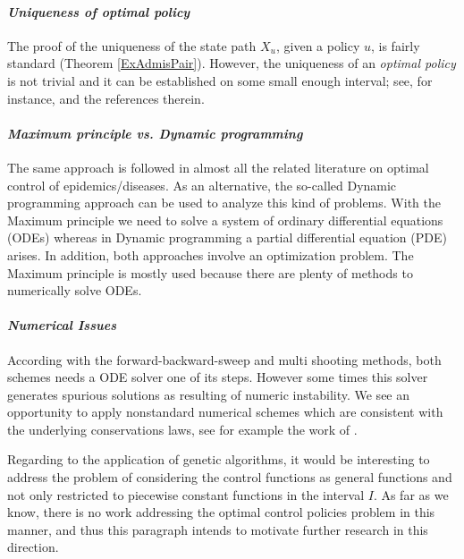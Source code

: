\paragraph{\it Uniqueness of optimal policy}
The proof of the uniqueness of the state path $X_u$, given a policy $u$, is
fairly standard (Theorem \ref{ExAdmisPair}). However, the uniqueness of an 
{\it optimal policy} is not trivial and it can be established on some small 
enough interval; see, for instance, \cite{GaffSchaefer09} and the references 
therein.  
\medskip

\paragraph{\it Maximum principle vs. Dynamic programming} 
  The same approach is followed in almost all the related literature on optimal
control of epidemics/diseases. As an alternative, the so-called Dynamic
programming approach can be used to analyze this kind of problems. With the
Maximum principle we need to solve a system of ordinary differential equations
(ODEs) whereas in Dynamic programming a partial differential equation (PDE)
arises. In addition, both approaches involve an optimization problem. The
Maximum principle is mostly used because there are plenty of methods to
numerically solve ODEs.
\medskip
\paragraph{\it Numerical Issues}

\medskip

  According with the forward-backward-sweep and multi shooting methods, both 
schemes needs a ODE solver one of its steps. However some times this solver 
generates spurious solutions as resulting of numeric instability. We see an 
opportunity to  apply nonstandard numerical schemes which are consistent with 
the underlying conservations laws, see for example the work of 
\citet{Mickens2007a}.
  
  Regarding to the application of genetic algorithms, it would be interesting 
to address the problem of considering the control functions as general 
functions and not only restricted to piecewise constant functions in the 
interval $I$. As far as we know, there is no work addressing  the optimal 
control policies problem in this manner, and thus this paragraph intends to 
motivate further research in this direction.

